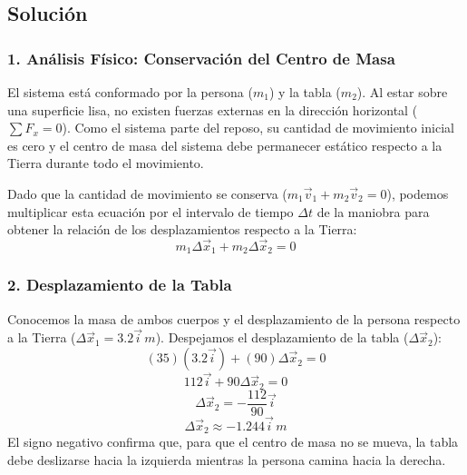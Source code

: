 \documentclass[12pt, a4paper]{article}
\begin{document}
\begin{center}
\end{center}

\subsection*{Solución}

\subsubsection*{1. Análisis Físico: Conservación del Centro de Masa}
El sistema está conformado por la persona ($m_1$) y la tabla ($m_2$). Al estar sobre una superficie lisa, no existen fuerzas externas en la dirección horizontal ($\sum F_x = 0$). Como el sistema parte del reposo, su cantidad de movimiento inicial es cero y el centro de masa del sistema debe permanecer estático respecto a la Tierra durante todo el movimiento.

Dado que la cantidad de movimiento se conserva ($m_1 \vec{v}_1 + m_2 \vec{v}_2 = 0$), podemos multiplicar esta ecuación por el intervalo de tiempo $\Delta t$ de la maniobra para obtener la relación de los desplazamientos respecto a la Tierra:
\[ m_1 \Delta\vec{x}_1 + m_2 \Delta\vec{x}_2 = 0 \]

\subsubsection*{2. Desplazamiento de la Tabla}
Conocemos la masa de ambos cuerpos y el desplazamiento de la persona respecto a la Tierra ($\Delta\vec{x}_1 = 3.2\vec{i} \, \si{m}$). Despejamos el desplazamiento de la tabla ($\Delta\vec{x}_2$):
\[ (35)(3.2\vec{i}) + (90)\Delta\vec{x}_2 = 0 \]
\[ 112\vec{i} + 90\Delta\vec{x}_2 = 0 \]
\[ \Delta\vec{x}_2 = -\frac{112}{90}\vec{i} \]
\[ \Delta\vec{x}_2 \approx -1.244\vec{i} \, \si{m} \]
El signo negativo confirma que, para que el centro de masa no se mueva, la tabla debe deslizarse hacia la izquierda mientras la persona camina hacia la derecha.
\end{document}
